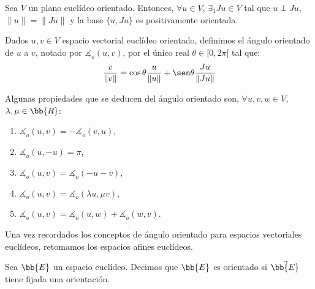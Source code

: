 \begin{teo}
    Sea $V$ un plano euclídeo orientado. Entonces, $\forall u\in V$, $\exists_1 Ju\in V$ tal que $u\perp Ju$, $\|u\| = \|Ju\|$ y la base $\{u,Ju\}$ es positivamente orientada.
\end{teo}
\begin{comment}
\begin{proof}
    Sea la base del plano positivamente orientada $\cc{B} = \{e_1,e_1\}$. Sea $u=(u_1,u_2)_{\cc{B}}$, y sea  $Ju=(x,y)_{\cc{B}}$. Veamos si esos valores de $x,y$ son únicos.

    Como $u\perp Ju$, entonces:
    \begin{equation*}
        \langle u,Ju\rangle = 0 \Longrightarrow u_1x+u_2y = 0
    \end{equation*}

    Como $\|u\| = \|Ju\|$, entonces:
    \begin{equation*}
        \sqrt{u_1^2+u_2^2} = \sqrt{x^2+y^2} \Longrightarrow u_1^2+u_2^2 = x^2+y^2
    \end{equation*}
\end{proof}
\end{comment}

\begin{definicion}
    Dados $u,v\in V$ espacio vectorial euclídeo orientado, definimos el ángulo orientado de $u$ a $v$, notado por $\measuredangle_o(u,v)$, por el único real $\theta\in [0,2\pi[$ tal que:
    \begin{equation*}
        \frac{v}{\|v\|} = \cos\theta \frac{u}{\|u\|} + \sen\theta \frac{Ju}{\|Ju\|}
    \end{equation*}
\end{definicion}

Algunas propiedades que se deducen del ángulo orientado son, $\forall u,v,w\in V$, $\lambda,\mu\in \bb{R}$:
\begin{enumerate}
    \item $\measuredangle_o(u,v) = -\measuredangle_o(v,u)$,
    \item $\measuredangle_o(u,-u) = \pi$,
    \item $\measuredangle_o (u,v) = \measuredangle_o(-u-v)$,
    \item $\measuredangle_o (u,v) = \measuredangle_o(\lambda u, \mu v)$,
    \item $\measuredangle_o (u,v) = \measuredangle_o(u,w) + \measuredangle_o(w,v)$.
\end{enumerate}

Una vez recordados los conceptos de ángulo orientado para espacios vectoriales euclídeos, retomamos los espacios afines euclídeos.
\begin{definicion}
    Sea $\bb{E}$ un espacio euclídeo. Decimos que $\bb{E}$ es orientado si $\vec{\bb{E}}$ tiene fijada una orientación.
\end{definicion}



